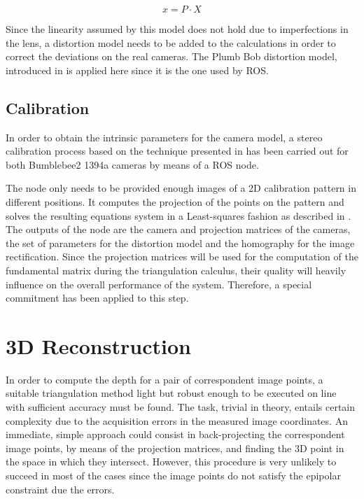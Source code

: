 \begin{equation}
x = P·X
\label{eq:pinhole_model}
\end{equation}  

Since the linearity assumed by this model does not hold due to imperfections in the lens, a distortion model needs to be added to the calculations in order to correct the deviations on the real cameras. 
The Plumb Bob distortion model, introduced in \cite{Brown} is applied here since it is the one used by ROS.

\subsection{Calibration}
In order to obtain the intrinsic parameters for the camera model, a stereo calibration process based on the technique presented in \cite{Zhang} has been carried out for both Bumblebee2 1394a cameras by means of a ROS node. 

The node only needs to be provided enough images of a 2D calibration pattern in different positions. 
It computes the projection of the points on the pattern and solves the resulting equations system in a Least-squares fashion as described in \cite{Hartley}. 
The outputs of the node are the camera and projection matrices of the cameras, the set of parameters for the distortion model and the homography for the image rectification. 
Since the projection matrices will be used for the computation of the fundamental matrix during the triangulation calculus, their quality will heavily influence on the overall performance of the system. 
Therefore, a special commitment has been applied to this step. 

\section{3D Reconstruction}
In order to compute the depth for a pair of correspondent image points, a suitable triangulation method light but robust enough to be executed on line with sufficient accuracy must be found. 
The task, trivial in theory, entails certain complexity due to the acquisition errors in the measured image coordinates. 
An immediate, simple approach could consist in back-projecting the correspondent image points, by means of the projection matrices, and finding the 3D point in the space in which they intersect. 
However, this procedure is very unlikely to succeed in most of the cases since the image points do not satisfy the epipolar constraint due the errors.

